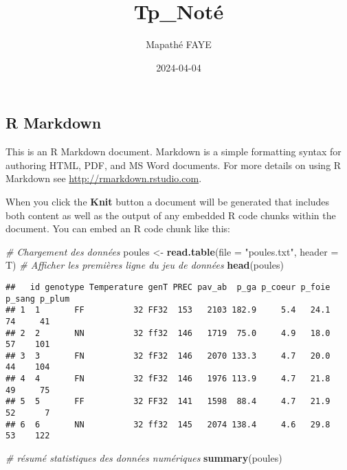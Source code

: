 \documentclass[
]{article}
\title{Tp\_Noté}
\author{Mapathé FAYE}
\date{2024-04-04}
\newenvironment{Shaded}{\begin{snugshade}}{\end{snugshade}}
\newcommand{\AttributeTok}[1]{\textcolor[rgb]{0.13,0.29,0.53}{#1}}
\newcommand{\CommentTok}[1]{\textcolor[rgb]{0.56,0.35,0.01}{\textit{#1}}}
\newcommand{\FunctionTok}[1]{\textcolor[rgb]{0.13,0.29,0.53}{\textbf{#1}}}
\newcommand{\NormalTok}[1]{#1}
\newcommand{\OtherTok}[1]{\textcolor[rgb]{0.56,0.35,0.01}{#1}}
\newcommand{\StringTok}[1]{\textcolor[rgb]{0.31,0.60,0.02}{#1}}
\begin{document}
\maketitle

\hypertarget{r-markdown}{%
\subsection{R Markdown}\label{r-markdown}}

This is an R Markdown document. Markdown is a simple formatting syntax
for authoring HTML, PDF, and MS Word documents. For more details on
using R Markdown see \url{http://rmarkdown.rstudio.com}.

When you click the \textbf{Knit} button a document will be generated
that includes both content as well as the output of any embedded R code
chunks within the document. You can embed an R code chunk like this:

\begin{Shaded}
\begin{Highlighting}[]
\CommentTok{\# Chargement des données }
\NormalTok{poules }\OtherTok{\textless{}{-}} \FunctionTok{read.table}\NormalTok{(}\AttributeTok{file =} \StringTok{"poules.txt"}\NormalTok{, }\AttributeTok{header =}\NormalTok{ T)}
\CommentTok{\# Afficher les premières ligne du jeu de données}
\FunctionTok{head}\NormalTok{(poules)}
\end{Highlighting}
\end{Shaded}

\begin{verbatim}
##   id genotype Temperature genT PREC pav_ab  p_ga p_coeur p_foie p_sang p_plum
## 1  1       FF          32 FF32  153   2103 182.9     5.4   24.1     74     41
## 2  2       NN          32 ff32  146   1719  75.0     4.9   18.0     57    101
## 3  3       FN          32 fF32  146   2070 133.3     4.7   20.0     44    104
## 4  4       FN          32 fF32  146   1976 113.9     4.7   21.8     49     75
## 5  5       FF          32 FF32  141   1598  88.4     4.7   21.9     52      7
## 6  6       NN          32 ff32  145   2074 138.4     4.6   29.8     53    122
\end{verbatim}

\begin{Shaded}
\begin{Highlighting}[]
\CommentTok{\# résumé statistiques des données numériques}
\FunctionTok{summary}\NormalTok{(poules)}
\end{Highlighting}
\end{Shaded}
\end{document}
